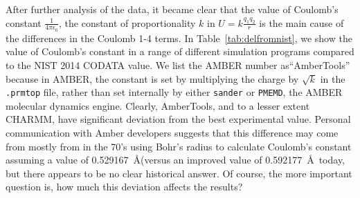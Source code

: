 After further analysis of the data, it became clear that the value of
Coulomb's constant $\frac{1}{4 \pi \epsilon_0}$, the constant of
proportionality $k$ in $U = k\frac{q_1q_2}{r}$ is the main cause of the
differences in the Coulomb 1-4 terms. In Table~\ref{tab:delfromnist},
we show the value of Coulomb's constant in a range of different
simulation programs compared to the NIST 2014 CODATA value.  We list
the AMBER number as``AmberTools''
because in AMBER, the constant is set by multiplying the charge by
$\sqrt{k}$ in the {\tt .prmtop} file, rather than set internally by
either {\tt sander} or {\tt PMEMD}, the AMBER molecular dynamics
engine.  Clearly, AmberTools, and to a lesser extent CHARMM, have
significant deviation from the best experimental value.  Personal
communication with Amber developers suggests that this difference may
come from mostly from in the 70's using Bohr's radius to calculate
Coulomb's constant assuming a value of 0.529167~\AA (versus an
improved value of 0.592177~\AA~today, but there appears to be no clear
historical answer.  Of course, the more important question is, how
much this deviation affects the results?

